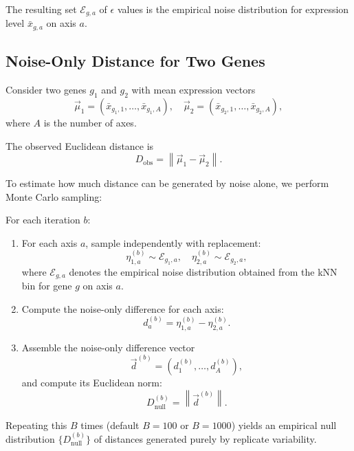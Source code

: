         The resulting set $\mathcal{E}_{g,a}$ of $\epsilon$ values is the empirical noise distribution for expression level $\bar{x}_{g,a}$ on axis $a$.

    \subsection{Noise-Only Distance for Two Genes}

        Consider two genes $g_1$ and $g_2$ with mean expression vectors
        \[
            \vec{\mu}_1 = (\bar{x}_{g_1,1}, \ldots, \bar{x}_{g_1,A}), \quad
            \vec{\mu}_2 = (\bar{x}_{g_2,1}, \ldots, \bar{x}_{g_2,A}),
        \]
        where $A$ is the number of axes.

        The observed Euclidean distance is
        \[
            D_{\mathrm{obs}} = \left\| \vec{\mu}_1 - \vec{\mu}_2 \right\|.
        \]

        To estimate how much distance can be generated by noise alone, we perform Monte Carlo sampling:

        For each iteration $b$:

        \begin{enumerate}
            \item For each axis $a$, sample independently with replacement:
                  \[
                      \eta_{1,a}^{(b)} \sim \mathcal{E}_{g_1,a}, \quad
                      \eta_{2,a}^{(b)} \sim \mathcal{E}_{g_2,a},
                  \]
                  where $\mathcal{E}_{g,a}$ denotes the empirical noise distribution obtained from the kNN bin for gene $g$ on axis $a$.
            \item Compute the noise-only difference for each axis:
                  \[
                      d_a^{(b)} = \eta_{1,a}^{(b)} - \eta_{2,a}^{(b)}.
                  \]
            \item Assemble the noise-only difference vector
                  \[
                      \vec{d}^{(b)} = (d_1^{(b)}, \ldots, d_A^{(b)}),
                  \]
                  and compute its Euclidean norm:
                  \[
                      D_{\mathrm{null}}^{(b)} = \left\| \vec{d}^{(b)} \right\|.
                  \]
        \end{enumerate}

        Repeating this $B$ times (default $B=100$ or $B=1000$) yields an empirical null distribution $\{D_{\mathrm{null}}^{(b)}\}$ of distances generated purely by replicate variability.

